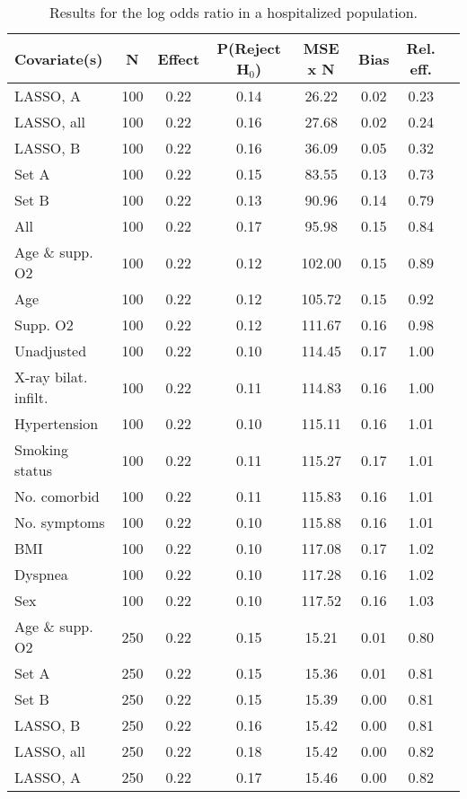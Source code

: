 \documentclass{article}
\begin{document}
{\tabcolsep=6pt  %
\begin{longtable}{lccccccc}
\caption{Results for the log odds ratio in a hospitalized population.}\label{tab14}\\
Covariate(s) & N & Effect & P(Reject H$_0$) & MSE x N & Bias & Rel. eff.\\ \midrule
LASSO, A & 100 & 0.22 & 0.14 & 26.22 & 0.02 & 0.23\\
LASSO, all & 100 & 0.22 & 0.16 & 27.68 & 0.02 & 0.24\\
LASSO, B & 100 & 0.22 & 0.16 & 36.09 & 0.05 & 0.32\\
Set A & 100 & 0.22 & 0.15 & 83.55 & 0.13 & 0.73\\
Set B & 100 & 0.22 & 0.13 & 90.96 & 0.14 & 0.79\\
All & 100 & 0.22 & 0.17 & 95.98 & 0.15 & 0.84\\
Age \& supp. O2 & 100 & 0.22 & 0.12 & 102.00 & 0.15 & 0.89\\
Age & 100 & 0.22 & 0.12 & 105.72 & 0.15 & 0.92\\
Supp. O2 & 100 & 0.22 & 0.12 & 111.67 & 0.16 & 0.98\\
Unadjusted & 100 & 0.22 & 0.10 & 114.45 & 0.17 & 1.00\\
X-ray bilat. infilt. & 100 & 0.22 & 0.11 & 114.83 & 0.16 & 1.00\\
Hypertension & 100 & 0.22 & 0.10 & 115.11 & 0.16 & 1.01\\
Smoking status & 100 & 0.22 & 0.11 & 115.27 & 0.17 & 1.01\\
No. comorbid & 100 & 0.22 & 0.11 & 115.83 & 0.16 & 1.01\\
No. symptoms & 100 & 0.22 & 0.10 & 115.88 & 0.16 & 1.01\\
BMI & 100 & 0.22 & 0.10 & 117.08 & 0.17 & 1.02\\
Dyspnea & 100 & 0.22 & 0.10 & 117.28 & 0.16 & 1.02\\
Sex & 100 & 0.22 & 0.10 & 117.52 & 0.16 & 1.03\\ \midrule
Age \& supp. O2 & 250 & 0.22 & 0.15 & 15.21 & 0.01 & 0.80\\
Set A & 250 & 0.22 & 0.15 & 15.36 & 0.01 & 0.81\\
Set B & 250 & 0.22 & 0.15 & 15.39 & 0.00 & 0.81\\
LASSO, B & 250 & 0.22 & 0.16 & 15.42 & 0.00 & 0.81\\
LASSO, all & 250 & 0.22 & 0.18 & 15.42 & 0.00 & 0.82\\
LASSO, A & 250 & 0.22 & 0.17 & 15.46 & 0.00 & 0.82\\

\end{longtable}}
\end{document}

